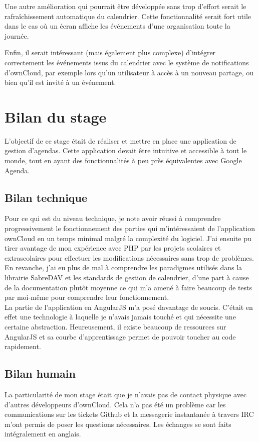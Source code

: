 \documentclass[10pt,a4paper, twoside]{report}
\newcommand{\mychapter}[2]{
	\setcounter{chapter}{#1}
	\setcounter{section}{0}
	\chapter*{#2}
	\addcontentsline{toc}{chapter}{#2}
}
\begin{document}
	Une autre amélioration qui pourrait être développée sans trop d'effort serait le rafraîchissement automatique du calendrier. Cette fonctionnalité serait fort utile dans le cas où un écran affiche les événements d'une organisation toute la journée.
	
	Enfin, il serait intéressant (mais également plus complexe) d'intégrer correctement les événements issus du calendrier avec le système de notifications d'ownCloud, par exemple lors qu'un utilisateur à accès à un nouveau partage, ou bien qu'il est invité à un événement.
	
	\mychapter{5}{Bilan du stage}
	L'objectif de ce stage était de réaliser et mettre en place une application de gestion d'agendas. Cette application devait être intuitive et accessible à tout le monde, tout en ayant des fonctionnalités à peu près équivalentes avec Google Agenda.
	\section{Bilan technique}
	Pour ce qui est du niveau technique, je note avoir réussi à comprendre progressivement le fonctionnement des parties qui m'intéressaient de l'application ownCloud en un temps minimal malgré la complexité du logiciel. J'ai ensuite pu tirer avantage de mon expérience avec PHP par les projets scolaires et extrascolaires pour effectuer les modifications nécessaires sans trop de problèmes.
	\\
	
	En revanche, j'ai eu plus de mal à comprendre les paradigmes utilisés dans la librairie SabreDAV et les standards de gestion de calendrier, d'une part à cause de la documentation plutôt moyenne ce qui m'a amené à faire beaucoup de tests par moi-même pour comprendre leur fonctionnement.
	\\
	
	La partie de l'application en AngularJS m'a posé davantage de soucis. C'était en effet une technologie à laquelle je n'avais jamais touché et qui nécessite une certaine abstraction. Heureusement, il existe beaucoup de ressources sur AngularJS et sa courbe d'apprentissage permet de pouvoir toucher au code rapidement.
	\section{Bilan humain}
	La particularité de mon stage était que je n'avais pas de contact physique avec d'autres développeurs d'ownCloud. Cela n'a pas été un problème car les communications sur les tickets Github et la messagerie instantanée à travers IRC m'ont permis de poser les questions nécessaires. Les échanges se sont faits intégralement en anglais.
	\\
	
\end{document}
